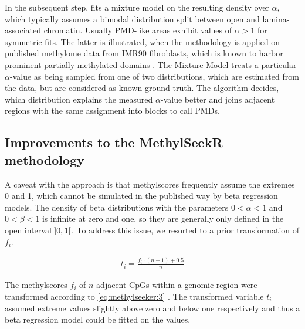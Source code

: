 In the subsequent step,  fits a mixture model on the resulting density over $\alpha$, which typically assumes a bimodal distribution split between open and lamina-associated chromatin. Usually PMD-like areas exhibit values of $\alpha > 1$ for symmetric fits. The latter is illustrated, when the methodology is applied on published methylome data from IMR90 fibroblasts, which is known to harbor prominent partially methylated domains . The Mixture Model treats a particular $\alpha$-value as being sampled from one of two distributions, which are estimated from the data, but are considered as known ground truth. The algorithm decides, which distribution explains the measured $\alpha$-value better and joins adjacent regions with the same assignment into blocks to call PMDs. 

\subsection{Improvements to the MethylSeekR methodology}
\label{chap:r:comprom:methylseeker:improvements} 

A caveat with the  approach is that methylscores frequently assume the extremes \num{0} and \num{1}, which cannot be simulated in the published way by beta regression models. The density of beta distributions with the parameters $0 < \alpha < 1$ and $0 < \beta < 1$ is infinite at zero and one, so they are generally only defined in the open interval $\interval[open]{0}{1}$. To address this issue, we resorted to a prior transformation of $f_i$.

\begin{eqnarray}
\label{eq:methylseeker:3} t_{i} = \frac{f_i \cdot (n - 1) + 0.5}{n}
\end{eqnarray}

The methylscores $f_i$ of $n$ adjacent CpGs within a genomic region were transformed according to \autoref{eq:methylseeker:3} \cite{Smithson2006}. The transformed variable $t_i$ assumed extreme values slightly above zero and below one respectively and thus a beta regression model could be fitted on the values. 

